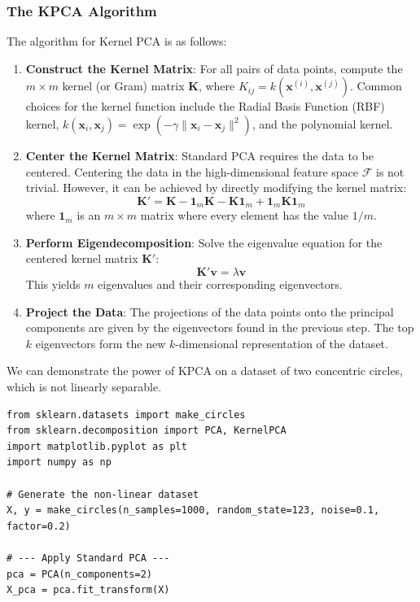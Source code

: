 \begin{enumerate}
\subsubsection*{The KPCA Algorithm}
The algorithm for Kernel PCA is as follows:
\begin{enumerate}
    \item \textbf{Construct the Kernel Matrix}: For all pairs of data points, compute the $m \times m$ kernel (or Gram) matrix $\mathbf{K}$, where $K_{ij} = k(\mathbf{x}^{(i)}, \mathbf{x}^{(j)})$. Common choices for the kernel function include the Radial Basis Function (RBF) kernel, $k(\mathbf{x}_i, \mathbf{x}_j) = \exp(-\gamma \|\mathbf{x}_i - \mathbf{x}_j\|^2)$, and the polynomial kernel.
    \item \textbf{Center the Kernel Matrix}: Standard PCA requires the data to be centered. Centering the data in the high-dimensional feature space $\mathcal{F}$ is not trivial. However, it can be achieved by directly modifying the kernel matrix:
    $$ \mathbf{K}' = \mathbf{K} - \mathbf{1}_m\mathbf{K} - \mathbf{K}\mathbf{1}_m + \mathbf{1}_m\mathbf{K}\mathbf{1}_m $$
    where $\mathbf{1}_m$ is an $m \times m$ matrix where every element has the value $1/m$.
    \item \textbf{Perform Eigendecomposition}: Solve the eigenvalue equation for the centered kernel matrix $\mathbf{K}'$:
    $$ \mathbf{K}' \mathbf{v} = \lambda \mathbf{v} $$
    This yields $m$ eigenvalues and their corresponding eigenvectors.
    \item \textbf{Project the Data}: The projections of the data points onto the principal components are given by the eigenvectors found in the previous step. The top $k$ eigenvectors form the new $k$-dimensional representation of the dataset.
\end{enumerate}

\begin{example}
We can demonstrate the power of KPCA on a dataset of two concentric circles, which is not linearly separable.
\begin{verbatim}
from sklearn.datasets import make_circles
from sklearn.decomposition import PCA, KernelPCA
import matplotlib.pyplot as plt
import numpy as np

# Generate the non-linear dataset
X, y = make_circles(n_samples=1000, random_state=123, noise=0.1, factor=0.2)

# --- Apply Standard PCA ---
pca = PCA(n_components=2)
X_pca = pca.fit_transform(X)


\end{verbatim}
\end{example}
\end{enumerate}
